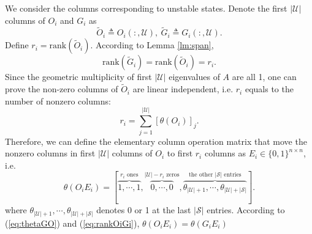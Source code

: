 \documentclass[12pt]{article}
\newcommand{\Uc}{{\mathcal{U}}}
\newcommand{\Sc}{{\mathcal{S}}}
\newcommand{\Oi}{{\tilde{O}_i}}
\newcommand{\Gi}{{\tilde{G}_i}}
\newcommand{\rank}{\text{rank}}
\begin{document}
We consider the columns corresponding to unstable states.
Denote the first $|\Uc|$ columns of $O_i$ and $G_i$ as $$\Oi\triangleq O_i(:,\Uc),\ \Gi\triangleq G_i(:,\Uc) .$$
Define $r_i=\rank(\Oi).$ According to Lemma \ref{lm:span}, 
\begin{equation}\label{eq:rankOiGi}
	\rank(\Gi)=\rank(\Oi)=r_i .
\end{equation}
Since the geometric multiplicity of first $|\Uc|$ eigenvalues of $A$ are all 1, one can prove the non-zero columns of $\Oi$ are linear independent, i.e. $r_i$ equals to the number of nonzero columns:
\begin{equation*}
	r_i=\sum_{j=1}^{|\Uc|} \left[\theta(O_i)\right]_j .
\end{equation*}
Therefore, we can define the elementary column operation matrix that move the nonzero columns in first $|\Uc|$ columns of $O_i$ to first $r_i$ columns as $E_i\in\{0,1\}^{n\times n}$, i.e. 
\begin{equation}
	\theta(O_i E_i)= [\overbrace{1,\cdots,1}^{r_i \text{ ones}},
	\overbrace{0,\cdots,0}^{|\Uc|-r_i\text{ zeros}},
	\overbrace{\theta_{|\Uc|+1},\cdots,\theta_{|\Uc|+|\Sc|}}^{\text{the other }|\Sc|\text{ entries}} ].
\end{equation}
where $\theta_{|\Uc|+1},\cdots,\theta_{|\Uc|+|\Sc|}$ denotes 0 or 1 at the last $|\Sc|$ entries. According to (\ref{eq:thetaGO}) and (\ref{eq:rankOiGi}), $\theta(O_i E_i)=\theta(G_i E_i)$
\end{document}
